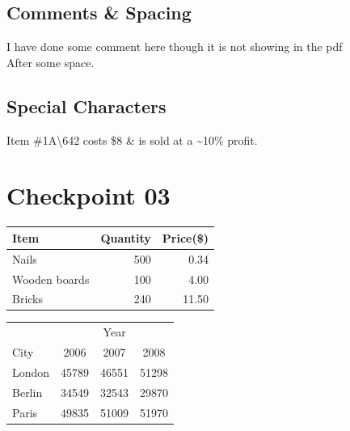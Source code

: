 \documentclass[a4paper,12pt]{article}
\begin{document}
\subsection{Comments \& Spacing}
I have done some comment here though it is not showing in the pdf %
\\    After some               space.

\subsection{Special Characters}
Item \#1A\textbackslash 642 costs \$8 \& is sold at a \~{}10\% profit.
 
\newpage
\section{Checkpoint 03}
\begin{tabular}{l|r|r}
    Item & Quantity & Price(\$) \\
    \hline
    Nails & 500 & 0.34 \\
    Wooden boards & 100 & 4.00 \\
    Bricks & 240 & 11.50 \\
\end{tabular}
\newline
\vspace{24pt}
\newline
\begin{tabular}{l|ccc}
     & \multicolumn{3}{c}{Year} \\
    \cline{2-4}
    City & 2006 & 2007 & 2008 \\
    \hline
    London & 45789 & 46551 & 51298 \\
    Berlin & 34549 & 32543 & 29870 \\
    Paris & 49835 & 51009 & 51970 \\
\end{tabular}
\newpage
\end{document}
